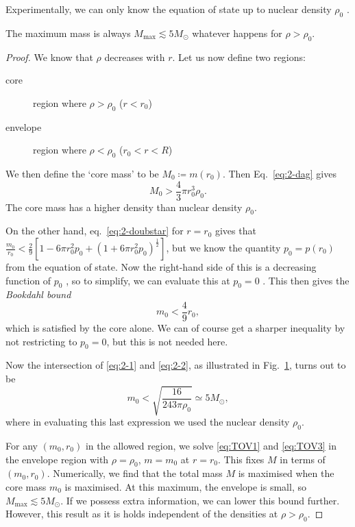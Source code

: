 Experimentally, we can only know the equation of state up to nuclear density $\rho_0$ .
\begin{claim}
  The maximum mass is always $M_{\text{max}} \lesssim 5 M_\odot$ whatever happens for $\rho > \rho_0$.
\end{claim}
\begin{proof}
  We know that $\rho$ decreases with $r$.
  Let us now define two regions:
  \begin{description}
    \item[core] region where $\rho > \rho_0$ ($r < r_0$)
    \item[envelope] region where $\rho < \rho_0$ ($r_0 < r < R$)
  \end{description}
  We then define the `core mass' to be $M_0 \coloneqq m(r_0)$.
  Then Eq.~\eqref{eq:2-dag} gives 
  \begin{equation}
    \label{eq:2-1}
    M_0 > \frac{4}{3} \pi r^3_0 \rho_0.
  \end{equation}
  The core mass has a higher density than nuclear density $\rho_0$.

  On the other hand, eq.~\eqref{eq:2-doubstar} for $r = r_0$ gives that $\frac{m_0}{r_0} < \frac{2}{9}\left[ 1 -6 \pi r_0^2 p_0 + (1 + 6 \pi r_0^2 p_0)^{\frac{1}{2}} \right]$, but we know the quantity $p_0 = p(r_0)$  from the equation of state.
  Now the right-hand side of this is a decreasing function of $p_0$ , so to simplify, we can evaluate this at $p_0 = 0$ . This then gives the \emph{Bookdahl bound}
  \begin{equation}
    \label{eq:2-2}
    m_0 < \frac{4}{9} r_0,
  \end{equation}
  which is satisfied by the core alone.
  We can of course get a sharper inequality by not restricting to $p_0 = 0$, but this is not needed here.
  \begin{figure}[tbhp]
    \centering
    \def\svgwidth{0.5\columnwidth}
    
    \caption{}
    \label{fig:l2f2}
  \end{figure}
  Now the intersection of \eqref{eq:2-1} and \eqref{eq:2-2}, as illustrated in Fig.~\ref{fig:l2f2}, turns out to be
  \begin{equation}
    m_0 < \sqrt{\frac{16}{243 \pi \rho_0}} \simeq 5 M_\odot,
  \end{equation}
  where in evaluating this last expression we used the nuclear density $\rho_0$.

  For any $(m_0, r_0)$ in the allowed region, we solve \eqref{eq:TOV1} and \eqref{eq:TOV3} in the envelope region with $\rho = \rho_0$, $m = m_0$ at $r = r_0$. This fixes $M$ in terms of $(m_0, r_0)$.
  Numerically, we find that the total mass $M$ is maximised when the core mass $m_0$ is maximised.
  At this maximum, the envelope is small, so $M_{\text{max}} \lesssim 5 M_\odot$.
  If we possess extra information, we can lower this bound further. However, this result as it is holds independent of the densities at $\rho > \rho_0$.
\end{proof}

